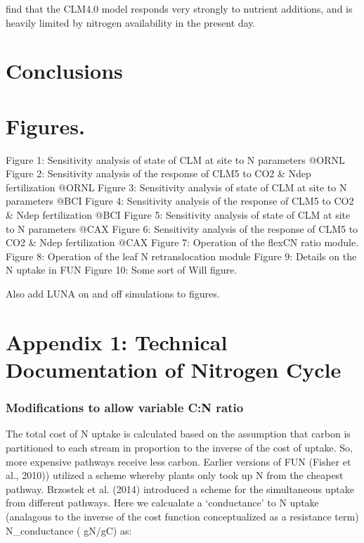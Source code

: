 \documentclass[draft,linenumbers]{agujournal}
\begin{document}
 \cite{thomas2013global} find that the CLM4.0 model responds very strongly to nutrient additions, and is heavily limited by nitrogen availability in the present day.


\section{Conclusions}

\section{Figures.}

Figure 1: Sensitivity analysis of state of CLM at site to N parameters @ORNL
Figure 2: Sensitivity analysis of the response of CLM5 to CO2 \& Ndep fertilization @ORNL
Figure 3: Sensitivity analysis of state of CLM at site to N parameters @BCI
Figure 4: Sensitivity analysis of the response of CLM5 to CO2 \& Ndep fertilization @BCI
Figure 5: Sensitivity analysis of state of CLM at site to N parameters @CAX
Figure 6: Sensitivity analysis of the response of CLM5 to CO2 \& Ndep fertilization @CAX
Figure 7: Operation of the flexCN ratio module. 
Figure 8: Operation of the leaf N retranslocation module
Figure 9: Details on the N uptake in FUN
Figure 10: Some sort of Will figure. 

Also add LUNA on and off simulations to figures. 

\nocite{*} 



\section{Appendix 1: Technical Documentation of Nitrogen Cycle}
\subsubsection{Modifications to allow variable C:N ratio}
The total cost of N uptake is calculated based on the assumption that carbon is partitioned to each stream in proportion to the inverse of the cost of uptake. So, more expensive pathways receive less carbon. Earlier versions of FUN (Fisher et al., 2010)) utilized a scheme whereby plants only took up N from the cheapest pathway. Brzostek et al. (2014) introduced a scheme for the simultaneous uptake from different pathways. Here we calcualate a ‘conductance’ to N uptake (analagous to the inverse of the cost function conceptualized as a resistance term) N_{conductance} ( gN/gC) as:
\end{document}
